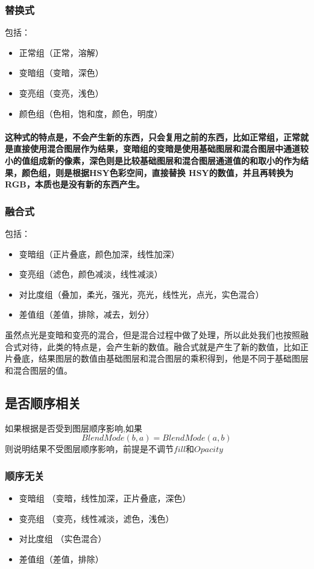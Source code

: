 \subsubsection{ 替换式}
包括：
\begin{itemize}
	\item  正常组（正常，溶解）
	\item 变暗组（变暗，深色）
	\item 变亮组（变亮，浅色）
	\item 颜色组（色相，饱和度，颜色，明度）
\end{itemize}
\paragraph{这种式的特点是，不会产生新的东西，只会复用之前的东西，比如正常组，正常就是直接使用混合图层作为结果，变暗组的变暗是使用基础图层和混合图层中通道较小的值组成新的像素，深色则是比较基础图层和混合图层通道值的和取小的作为结果，颜色组，则是根据HSY色彩空间，直接替换 HSY的数值，并且再转换为RGB，本质也是没有新的东西产生。}
\subsubsection{ 融合式}
包括：
\begin{itemize}
	\item 变暗组（正片叠底，颜色加深，线性加深）
	\item 变亮组（滤色，颜色减淡，线性减淡）
	\item 对比度组（叠加，柔光，强光，亮光，线性光，点光，实色混合）
	\item 差值组（差值，排除，减去，划分）
\end{itemize}
虽然点光是变暗和变亮的混合，但是混合过程中做了处理，所以此处我们也按照融合式对待，此类的特点是，会产生新的数值。融合式就是产生了新的数值，比如正片叠底，结果图层的数值由基础图层和混合图层的乘积得到，他是不同于基础图层和混合图层的值。
\subsection{ 是否顺序相关}
如果根据是否受到图层顺序影响,如果$$BlendMode(b,a)=BlendMode(a,b)$$
则说明结果不受图层顺序影响，前提是不调节$fill$和$Opacity$
\subsubsection{ 顺序无关}
\begin{itemize}
	\item 变暗组 （变暗，线性加深，正片叠底，深色）
	\item 变亮组 （变亮，线性减淡，滤色，浅色）
	\item 对比度组 （实色混合）
	\item 差值组（差值，排除）
\end{itemize}

